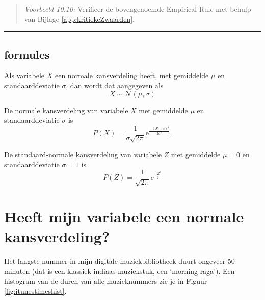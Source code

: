 \documentclass[
]{book}
\begin{document}
\begin{quote}
\emph{Voorbeeld 10.10:}
Verifieer de bovengenoemde Empirical Rule met behulp van
Bijlage \ref{app:kritiekeZwaarden}.
\end{quote}

\begin{center}\rule{0.5\linewidth}{0.5pt}\end{center}

\hypertarget{formules-1}{%
\subsection{formules}\label{formules-1}}

Als variabele \(X\) een normale kansverdeling heeft, met gemiddelde \(\mu\)
en standaarddeviatie \(\sigma\), dan wordt dat aangegeven als
\begin{equation}
  X \sim \mathcal{N}(\mu,\sigma)
  \label{eq:normaalverdeeld}
\end{equation}

De normale kansverdeling van variabele \(X\) met gemiddelde \(\mu\) en
standaarddeviatie \(\sigma\) is
\begin{equation}
  P(X) = \frac{1}{\sigma \sqrt{2\pi}} \mbox{e}^{ \frac{-(X-\mu)^2}{2\sigma^2} }.
  \label{eq:prob-normal}
\end{equation}

De standaard-normale kansverdeling van variabele \(Z\) met gemiddelde
\(\mu=0\) en standaarddeviatie \(\sigma=1\) is
\begin{equation}
    P(Z) = \frac{1}{\sqrt{2\pi}} \mbox{e}^{ \frac{-Z^2}{2} }
  \label{eq:prob-standaardnormaal}
\end{equation}

\hypertarget{sec:isvarnormaalverdeeld}{%
\section{Heeft mijn variabele een normale kansverdeling?}\label{sec:isvarnormaalverdeeld}}

Het langste nummer in mijn digitale muziekbibliotheek duurt ongeveer 50
minuten (dat is een klassiek-indiaas muziekstuk, een `morning raga').
Een histogram van de duren van alle muzieknummers zie je in
Figuur \ref{fig:itunestimeshist}.
\end{document}
